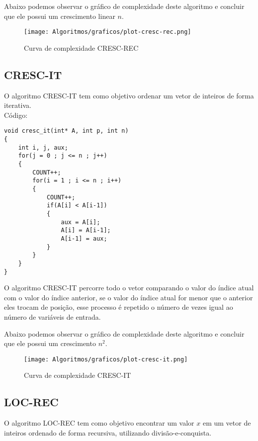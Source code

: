 \documentclass[a4paper, 12pt]{article}
\begin{document}
Abaixo podemos observar o gráfico de complexidade deste algoritmo e concluir que ele possui um crescimento linear $n$.

\begin{figure}[h]
	\centering
	\texttt{[image: Algoritmos/graficos/plot-cresc-rec.png]}
	\caption{Curva de complexidade CRESC-REC}
	\label{fig:cresc-rec}
\end{figure}

\newpage 


\subsection{CRESC-IT}

O algoritmo CRESC-IT tem como objetivo ordenar um vetor de inteiros de forma iterativa.\\


Código:

\begin{lstlisting}
void cresc_it(int* A, int p, int n)
{
	int i, j, aux;
	for(j = 0 ; j <= n ; j++)
	{
		COUNT++;
		for(i = 1 ; i <= n ; i++)
		{	
			COUNT++;
			if(A[i] < A[i-1])
			{
				aux = A[i];
				A[i] = A[i-1];
				A[i-1] = aux;
			}
		}	
	}
}
\end{lstlisting}

O algoritmo CRESC-IT percorre todo o vetor comparando o valor do índice atual com o valor do índice anterior, se o valor do índice atual for menor que o anterior eles trocam de posição, esse processo é repetido o número de vezes igual ao número de variáveis de entrada.


Abaixo podemos observar o gráfico de complexidade deste algoritmo e concluir que ele possui um crescimento $n^2$.

\begin{figure}[h]
	\centering
	\texttt{[image: Algoritmos/graficos/plot-cresc-it.png]}
	\caption{Curva de complexidade CRESC-IT}
	\label{fig:cresc-it}
\end{figure}

\newpage

\subsection{LOC-REC}

O algoritmo LOC-REC tem como objetivo encontrar um valor $x$ em um vetor de inteiros ordenado de forma recursiva, utilizando divisão-e-conquista.\\
\end{document}

